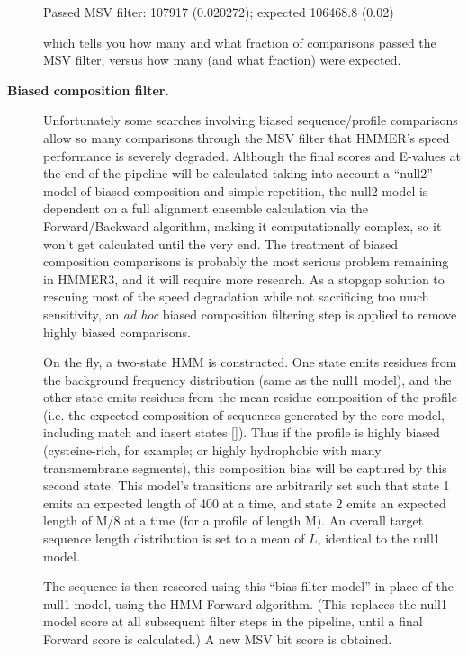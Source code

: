 \begin{description}
\begin{sreoutput}
 Passed MSV filter:                    107917  (0.020272); expected 106468.8 (0.02)
\end{sreoutput}

 which tells you how many and what fraction of comparisons passed the
 MSV filter, versus how many (and what fraction) were expected. 

\item[\textbf{Biased composition filter.}]
 Unfortunately some searches involving biased sequence/profile
 comparisons allow so many comparisons through the MSV filter that
 HMMER's speed performance is severely degraded. Although the final
 scores and E-values at the end of the pipeline will be calculated
 taking into account a ``null2'' model of biased composition and
 simple repetition, the null2 model is dependent on a full alignment
 ensemble calculation via the Forward/Backward algorithm, making it
 computationally complex, so it won't get calculated until the very
 end. The treatment of biased composition comparisons is probably the
 most serious problem remaining in HMMER3, and it will require more
 research. As a stopgap solution to rescuing most of the speed
 degradation while not sacrificing too much sensitivity, an \emph{ad
   hoc} biased composition filtering step is applied to remove highly
 biased comparisons.

 On the fly, a two-state HMM is constructed. One state emits residues
 from the background frequency distribution (same as the null1 model),
 and the other state emits residues from the mean residue composition
 of the profile (i.e. the expected composition of sequences generated
 by the core model, including match and insert states
 []). Thus if the profile
 is highly biased (cysteine-rich, for example; or highly hydrophobic
 with many transmembrane segments), this composition bias will be
 captured by this second state. This model's transitions are
 arbitrarily set such that state 1 emits an expected length of 400 at
 a time, and state 2 emits an expected length of M/8 at a time (for a
 profile of length M). An overall target sequence length distribution
 is set to a mean of $L$, identical to the null1 model. 

 The sequence is then rescored using this ``bias filter model'' in
 place of the null1 model, using the HMM Forward algorithm. (This
 replaces the null1 model score at all subsequent filter steps in the
 pipeline, until a final Forward score is calculated.) A new MSV bit
 score is obtained.


\end{description}
